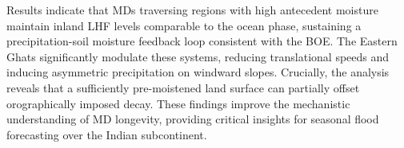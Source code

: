 \documentclass[12pt]{article}
\begin{document}
\noindent Results indicate that MDs traversing regions with high antecedent moisture maintain inland LHF levels comparable to the ocean phase, sustaining a precipitation-soil moisture feedback loop consistent with the BOE. The Eastern Ghats significantly modulate these systems, reducing translational speeds and inducing asymmetric precipitation on windward slopes. Crucially, the analysis reveals that a sufficiently pre-moistened land surface can partially offset orographically imposed decay. These findings improve the mechanistic understanding of MD longevity, providing critical insights for seasonal flood forecasting over the Indian subcontinent.
\end{document}
